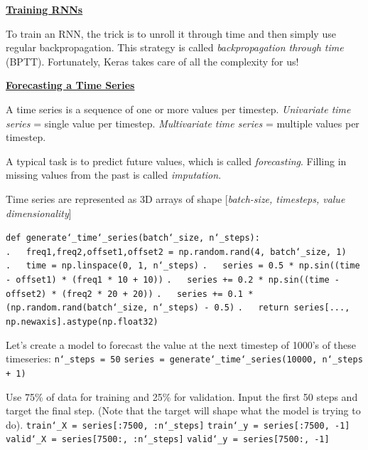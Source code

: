\vspace{+4.0mm}
\textbf{\underline{Training RNNs}}

To train an RNN, the trick is to unroll it through time and then simply use regular backpropagation.
This strategy is called \textit{backpropagation through time} (BPTT).
Fortunately, Keras takes care of all the complexity for us!\newline

\textbf{\underline{Forecasting a Time Series}}

A time series is a sequence of one or more values per timestep.\newline
\textit{Univariate time series} = single value per timestep.\newline
\textit{Multivariate time series} = multiple values per timestep.

A typical task is to predict future values, which is called \textit{forecasting}.\newline
Filling in missing values from the past is called \textit{imputation}.

\newpage

Time series are represented as 3D arrays of shape [\textit{batch-size, timesteps, value dimensionality}]

\texttt{def generate\char`_time\char`_series(batch\char`_size, n\char`_steps):}\newline
\texttt{.~~~freq1,freq2,offset1,offset2 = np.random.rand(4, batch\char`_size, 1)}\newline
\texttt{.~~~time = np.linspace(0, 1, n\char`_steps)}\newline
\texttt{.~~~series = 0.5 * np.sin((time - offset1) * (freq1 * 10 + 10))}\newline
\texttt{.~~~series += 0.2 * np.sin((time - offset2) * (freq2 * 20 + 20))}\newline
\texttt{.~~~series += 0.1 * (np.random.rand(batch\char`_size, n\char`_steps) - 0.5)}\newline
\texttt{.~~~return series[..., np.newaxis].astype(np.float32)}\newline

Let's create a model to forecast the value at the next timestep of 1000's of these timeseries:\newline
\texttt{n\char`_steps = 50}\newline
\texttt{series = generate\char`_time\char`_series(10000, n\char`_steps + 1)}

Use 75\% of data for training and 25\% for validation.
Input the first 50 steps and target the final step. (Note that the target will shape what the model is trying to do).\newline
\texttt{train\char`_X = series[:7500, :n\char`_steps]}\newline
\texttt{train\char`_y = series[:7500, -1]}\newline
\texttt{valid\char`_X = series[7500:, :n\char`_steps]}\newline
\texttt{valid\char`_y = series[7500:, -1]}\newline\newline

